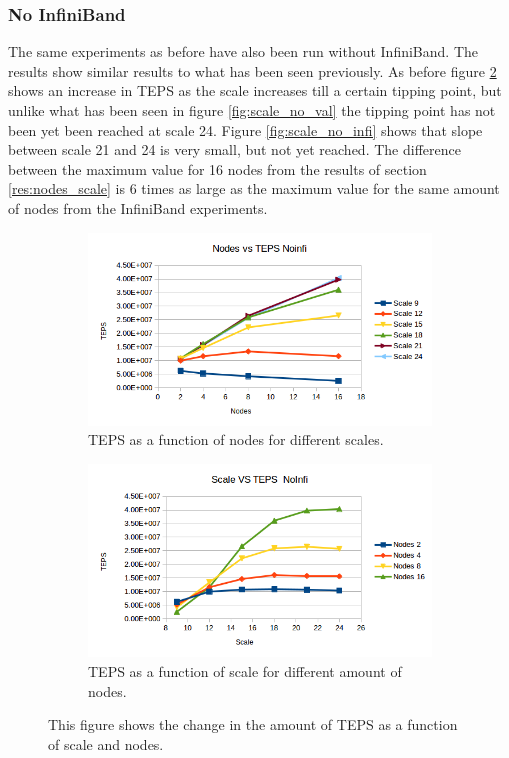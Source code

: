 \subsubsection{No InfiniBand}
The same experiments as before have also been run without InfiniBand. The results show similar results to what has been seen previously. As before figure \ref{fig:scale_no_infini} shows an increase in TEPS as the scale increases till a certain tipping point, but unlike what has been seen in figure \ref{fig:scale_no_val} the tipping point has not been yet been reached at scale 24. Figure \ref{fig:scale_no_infi} shows that slope between scale 21 and 24 is very small, but not yet reached. The difference between the maximum value for 16 nodes from the results of section \ref{res:nodes_scale} is 6 times as large as the maximum value for the same amount of nodes from the InfiniBand experiments.
\begin{figure}[!h]
\centering
\begin{subfigure}{.5\textwidth}
  \centering
  \includegraphics[width=\linewidth]{images/nodes_no_infini.png}
  \caption{TEPS as a function of nodes for different scales.}
  \label{fig:nodes_no_infini}
\end{subfigure}%
\begin{subfigure}{.5\textwidth}
  \centering
  \includegraphics[width=\linewidth]{images/scale_no_infini.png}
  \caption{TEPS as a function of scale for different amount of nodes.}
  \label{fig:scale_no_infini}
\end{subfigure}
\caption{This figure shows the change in the amount of TEPS as a function of scale and nodes.}
\label{fig:das_no_infini}
\end{figure}

